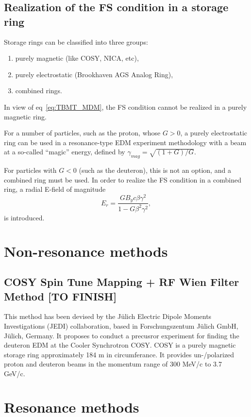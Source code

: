 \documentclass{article}
\begin{document}
\subsection{Realization of the FS condition in a storage ring}
Storage rings can be classified into three groups:
\begin{enumerate}
\item purely magnetic (like COSY, NICA, etc),
\item purely electrostatic (Brookhaven AGS Analog Ring),
\item combined rings.
\end{enumerate}

In view of eq~\eqref{eq:TBMT_MDM}, the FS condition cannot be realized in a purely magnetic ring.

For a number of particles, such as the proton, whose $G>0$, a purely electrostatic ring can be used in a resonance-type EDM experiment methodology with a beam at a so-called ``magic'' energy, defined by $\gamma_{mag} = \sqrt{(1+G)/G}$.

For particles with $G<0$ (such as the deuteron), this is not an option, and a combined ring must be used. In order to realize the FS condition in a combined ring, a radial E-field of magnitude
\begin{equation}\label{eq:FS_Er}
  E_r = \frac{GB_yc\beta\gamma^2}{1-G\beta^2\gamma^2},
\end{equation}
is introduced.~\cite{BNL:Deuteron2008}

\section{Non-resonance methods}

\subsection{COSY Spin Tune Mapping + RF Wien Filter Method [TO FINISH]}
This method has been devised by the J\"ulich Electric Dipole Moments Investigations (JEDI) collaboration, based in Forschungszentum J\"ulich GmbH, J\"ulich, Germany. It proposes to conduct a precusror experiment for finding the deuteron EDM at the Cooler Synchrotron COSY. COSY is a purely magnetic storage ring approximately 184 m in circumferance. It provides un-/polarized proton and deuteron beams in the momentum range of 300 MeV/c to 3.7 GeV/c.~\cite{COSY:ElectronCooling}

\section{Resonance methods}
\end{document}
